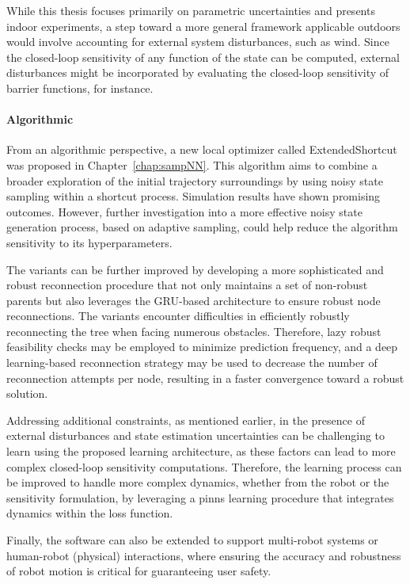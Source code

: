 While this thesis focuses primarily on parametric uncertainties and presents indoor experiments, a step toward a more general framework applicable outdoors would involve accounting for external system disturbances, such as wind.
Since the closed-loop sensitivity of any function of the state can be computed, external disturbances might be incorporated by evaluating the closed-loop sensitivity of barrier functions, for instance.

\paragraph{Algorithmic}

From an algorithmic perspective, a new local optimizer called ExtendedShortcut was proposed in Chapter~\ref{chap:sampNN}. 
This algorithm aims to combine a broader exploration of the initial trajectory surroundings by using noisy state sampling within a shortcut process. 
Simulation results have shown promising outcomes. 
However, further investigation into a more effective noisy state generation process, based on adaptive sampling, could help reduce the algorithm sensitivity to its hyperparameters.

The  variants can be further improved by developing a more sophisticated and robust reconnection procedure that not only maintains a set of non-robust parents but also leverages the GRU-based architecture to ensure robust node reconnections.
The  variants encounter difficulties in efficiently robustly reconnecting the tree when facing numerous obstacles. 
Therefore, lazy robust feasibility checks may be employed to minimize prediction frequency, and a deep learning-based reconnection strategy may be used to decrease the number of reconnection attempts per node, resulting in a faster convergence toward a robust solution.

Addressing additional constraints, as mentioned earlier, in the presence of external disturbances and state estimation uncertainties can be challenging to learn using the proposed learning architecture, as these factors can lead to more complex closed-loop sensitivity computations.
Therefore, the learning process can be improved to handle more complex dynamics, whether from the robot or the sensitivity formulation, by leveraging a \gls{pinns} learning procedure that integrates  dynamics within the loss function.

Finally, the software can also be extended to support multi-robot systems or human-robot (physical) interactions, where ensuring the accuracy and robustness of robot motion is critical for guaranteeing user safety.